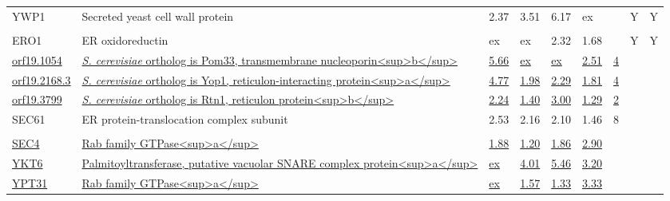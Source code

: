\begin{ThreePartTable}
\begin{longtable}[t]{lllllllll}
\hspace{1em}YWP1 & Secreted yeast cell wall protein & 2.37 & 3.51 & 6.17 & ex &  & Y & Y\\
\addlinespace[0.3em]
\multicolumn{9}{l}{\textbf{Endoplasmic reticulum}}\\
\hspace{1em}ERO1 & ER oxidoreductin & ex & ex & 2.32 & 1.68 &  & Y & Y\\
\hspace{1em}\underline{orf19.1054} & \underline{\textit{S. cerevisiae} ortholog is Pom33, transmembrane nucleoporin<sup>b</sup>} & \underline{5.66} & \underline{ex} & \underline{ex} & \underline{2.51} & \underline{4} & \underline{} & \underline{}\\
\hspace{1em}\underline{orf19.2168.3} & \underline{\textit{S. cerevisiae} ortholog is Yop1, reticulon-interacting protein<sup>a</sup>} & \underline{4.77} & \underline{1.98} & \underline{2.29} & \underline{1.81} & \underline{4} & \underline{} & \underline{}\\
\hspace{1em}\underline{orf19.3799} & \underline{\textit{S. cerevisiae} ortholog is Rtn1, reticulon protein<sup>b</sup>} & \underline{2.24} & \underline{1.40} & \underline{3.00} & \underline{1.29} & \underline{2} & \underline{} & \underline{}\\
\hspace{1em}SEC61 & ER protein-translocation complex subunit & 2.53 & 2.16 & 2.10 & 1.46 & 8 &  & \\
\addlinespace[0.3em]
\multicolumn{9}{l}{\textbf{Endosome, Golgi, transport vesicle}}\\
\hspace{1em}\underline{SEC4} & \underline{Rab family GTPase<sup>a</sup>} & \underline{1.88} & \underline{1.20} & \underline{1.86} & \underline{2.90} & \underline{} & \underline{} & \underline{}\\
\hspace{1em}\underline{YKT6} & \underline{Palmitoyltransferase, putative vacuolar SNARE complex protein<sup>a</sup>} & \underline{ex} & \underline{4.01} & \underline{5.46} & \underline{3.20} & \underline{} & \underline{} & \underline{}\\
\hspace{1em}\underline{YPT31} & \underline{Rab family GTPase<sup>a</sup>} & \underline{ex} & \underline{1.57} & \underline{1.33} & \underline{3.33} & \underline{} & \underline{} & \underline{}\\

\end{longtable}
\end{ThreePartTable}
